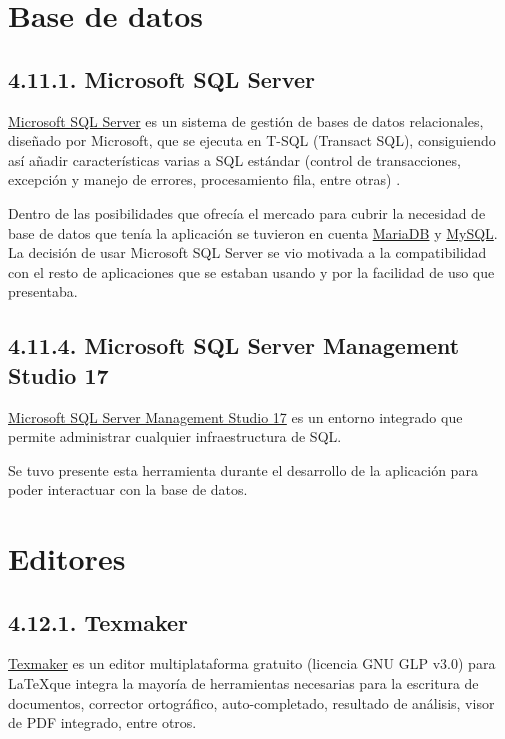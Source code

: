 \section{Base de datos}

\subsection{4.11.1. Microsoft SQL Server}

\href{https://www.microsoft.com/es-es/sql-server/sql-server-2017}{Microsoft SQL Server} es un sistema de gestión de bases de datos relacionales, diseñado por Microsoft, que se ejecuta en T-SQL (Transact SQL), consiguiendo así añadir características varias a SQL estándar (control de transacciones, excepción y manejo de errores, procesamiento fila, entre otras) \cite{web:sqlServer}.

Dentro de las posibilidades que ofrecía el mercado para cubrir la necesidad de base de datos que tenía la aplicación se tuvieron en cuenta \href{https://mariadb.org/}{MariaDB} y \href{https://www.mysql.com/}{MySQL}. La decisión de usar Microsoft SQL Server se vio motivada a la compatibilidad con el resto de aplicaciones que se estaban usando y por la facilidad de uso que presentaba.

\subsection{4.11.4. Microsoft SQL Server Management Studio 17}

\href{https://docs.microsoft.com/es-es/sql/ssms/download-sql-server-management-studio-ssms?view=sql-server-2017}{Microsoft SQL Server Management Studio 17} es un entorno integrado que permite administrar cualquier infraestructura de SQL.

Se tuvo presente esta herramienta durante el desarrollo de la aplicación para poder interactuar con la base de datos.

\section{Editores}

\subsection{4.12.1. Texmaker}

\href{http://www.xm1math.net/texmaker/}{Texmaker} es un editor multiplataforma gratuito (licencia GNU GLP v3.0) para \LaTeX que integra la mayoría de herramientas necesarias para la escritura de documentos, corrector ortográfico, auto-completado, resultado de análisis, visor de PDF integrado, entre otros.

